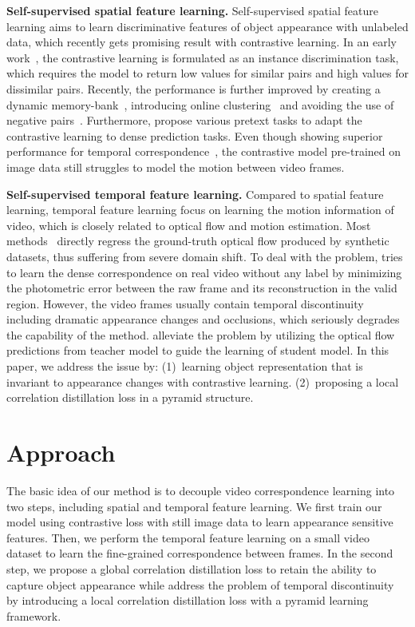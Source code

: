 \documentclass{article}
\begin{document}
\textbf{Self-supervised spatial feature learning.} Self-supervised spatial feature learning aims to learn discriminative features of object appearance with unlabeled data, which recently gets promising result with contrastive learning. In an early work~\cite{wu2018unsupervised}, the contrastive learning is formulated as an instance discrimination task, which requires the model to return low values for similar pairs and high values for dissimilar pairs. Recently, the performance is further improved by creating a dynamic memory-bank~\cite{he2020momentum}, introducing online clustering~\cite{caron2020unsupervised} and avoiding the use of negative pairs~\cite{chen2021exploring}\cite{grill2020bootstrap}. Furthermore, \cite{wang2021dense}\cite{xie2021detco}\cite{yang2021instance} propose various pretext tasks to adapt the contrastive learning to dense prediction tasks. Even though showing superior performance for temporal correspondence~\cite{wang2021different}, the contrastive model pre-trained on image data still struggles to model the motion between video frames. 

\textbf{Self-supervised temporal feature learning. } 
Compared to spatial feature learning, temporal feature learning focus on learning the motion information of video, which is closely related to optical flow and motion estimation. Most methods~\cite{dosovitskiy2015flownet}\cite{teed2020raft} directly regress the ground-truth optical flow produced by synthetic datasets, thus suffering from severe domain shift. To deal with the problem, \cite{meister2018unflow} tries to learn the dense correspondence on real video without any label by minimizing the photometric error between the raw frame and its reconstruction in the valid region. However, the video frames usually contain temporal discontinuity including dramatic appearance changes and occlusions, which seriously degrades the capability of the method. \cite{jonschkowski2020matters}\cite{liu2020learning}\cite{liu2019ddflow} alleviate the problem by utilizing the optical flow predictions from teacher model to guide the learning of student model. In this paper, we address the issue by: (1)~learning object representation that is invariant to appearance changes with contrastive learning. (2)~proposing a local correlation distillation loss in a pyramid structure. 


\section{Approach}
The basic idea of our method is to decouple video correspondence learning into two  steps, including spatial and temporal feature learning. We first train our model using contrastive loss with still image data to learn appearance sensitive features. Then, we perform the temporal feature learning on a small video dataset to learn the fine-grained correspondence between frames. In the second step, we propose a global correlation distillation loss to retain the ability to capture object appearance while address the problem of temporal discontinuity by introducing a local correlation distillation loss with a pyramid learning framework.
\end{document}
